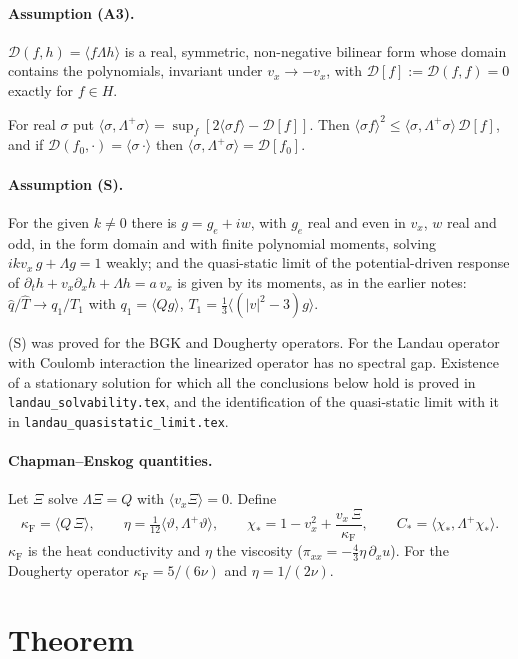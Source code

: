 \documentclass[11pt]{article}
\newcommand{\cD}{\mathcal{D}}
\newcommand{\avg}[1]{\langle #1\rangle}
\theoremstyle{remark}
\begin{document}
\paragraph{Assumption (A3).} $\cD(f,h)=\avg{f\Lambda h}$ is a real,
symmetric, non-negative bilinear form whose domain contains the polynomials,
invariant under $v_x\to-v_x$, with $\cD[f]:=\cD(f,f)=0$ exactly for $f\in H$.

For real $\sigma$ put
$\avg{\sigma,\Lambda^+\sigma}=\sup_f[2\avg{\sigma f}-\cD[f]]$. Then
$\avg{\sigma f}^2\le\avg{\sigma,\Lambda^+\sigma}\,\cD[f]$, and if
$\cD(f_0,\cdot)=\avg{\sigma\,\cdot}$ then
$\avg{\sigma,\Lambda^+\sigma}=\cD[f_0]$.

\paragraph{Assumption (S).} For the given $k\ne0$ there is $g=g_e+iw$, with
$g_e$ real and even in $v_x$, $w$ real and odd, in the form domain and with
finite polynomial moments, solving $ikv_x\,g+\Lambda g=1$ weakly; and the
quasi-static limit of the potential-driven response of
$\partial_th+v_x\partial_xh+\Lambda h=a\,v_x$ is given by its moments, as in
the earlier notes: $\hat q/\hat T\to q_1/T_1$ with $q_1=\avg{Qg}$,
$T_1=\tfrac13\avg{(|v|^2-3)g}$.

\medskip
(S) was proved for the BGK and Dougherty operators. For the Landau operator
with Coulomb interaction the linearized operator has no spectral gap.
Existence of a stationary solution for which all the conclusions below hold
is proved in \texttt{landau\_solvability.tex}, and the identification of
the quasi-static limit with it in \texttt{landau\_quasistatic\_limit.tex}.

\paragraph{Chapman--Enskog quantities.} Let $\Xi$ solve $\Lambda\Xi=Q$ with
$\avg{v_x\Xi}=0$. Define
\begin{equation}
  \kappa_{\mathrm F}=\avg{Q\,\Xi},\qquad
  \eta=\tfrac1{12}\avg{\vartheta,\Lambda^+\vartheta},\qquad
  \chi_*=1-v_x^2+\frac{v_x\,\Xi}{\kappa_{\mathrm F}},\qquad
  C_*=\avg{\chi_*,\Lambda^+\chi_*}.
\end{equation}
$\kappa_{\mathrm F}$ is the heat conductivity and $\eta$ the viscosity
($\pi_{xx}=-\tfrac43\eta\,\partial_xu$). For the Dougherty operator
$\kappa_{\mathrm F}=5/(6\nu)$ and $\eta=1/(2\nu)$.

\section{Theorem}
\end{document}
